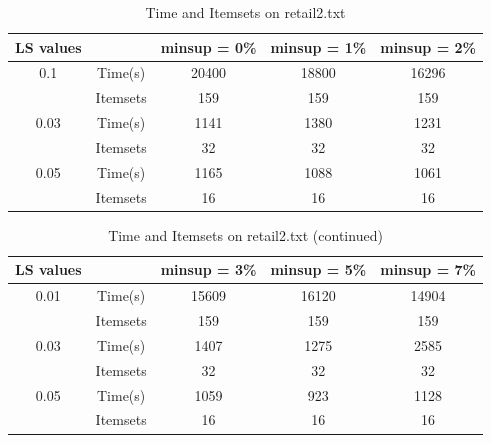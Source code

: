 \documentclass[12pt]{article}
\begin{document}
\begin{table} [h] %
    \centering
    \begin{tabular}{ |c|c|c|c|c| }
        \hline
        \textbf{LS values} & &  \textbf{minsup = 0\%} & \textbf{minsup = 1\%} & \textbf{minsup = 2\%} \\
        \hline
        \hline
        0.1 & Time(s) & 20400 & 18800 & 16296  \\
        & Itemsets & 159 & 159 & 159 \\
        \hline
        0.03 & Time(s) & 1141 & 1380 & 1231 \\
        & Itemsets & 32 & 32 & 32 \\
        \hline
        0.05 & Time(s) & 1165 & 1088 & 1061 \\
        & Itemsets & 16 & 16 & 16 \\
        \hline
        \end{tabular}
    \caption{Time and Itemsets on retail2.txt}
\end{table}

\begin{table}[h]
    \centering
    \begin{tabular}{ |c|c|c|c|c| }
        \hline
        \textbf{LS values} & & \textbf{minsup = 3\%} & \textbf{minsup = 5\%} & \textbf{minsup = 7\%} \\
        \hline
        \hline
        0.01 & Time(s) & 15609 & 16120 & 14904  \\
        & Itemsets & 159 & 159 & 159 \\
        \hline
        0.03 & Time(s) & 1407 & 1275 & 2585 \\
        & Itemsets & 32 & 32 & 32 \\
        \hline
        0.05 & Time(s) & 1059 & 923 & 1128 \\
        & Itemsets & 16 & 16 & 16 \\
        \hline
        \end{tabular}
    \caption{Time and Itemsets on retail2.txt (continued)}
\end{table}
\end{document}
